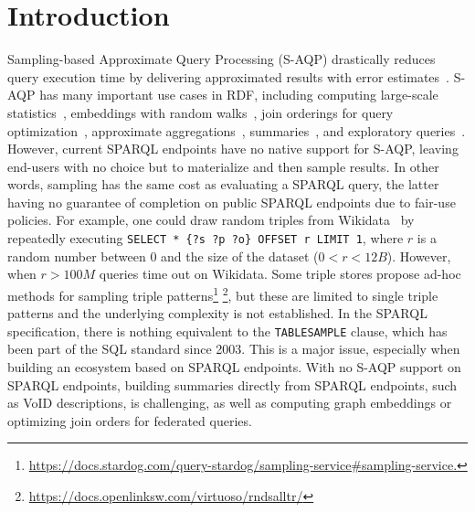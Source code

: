 
\section{Introduction}

Sampling-based Approximate Query Processing (S-AQP) drastically reduces query
execution time by delivering approximated results with error
estimates~\cite{DBLP:conf/sigmod/AgarwalMKTJMMS14}. S-AQP has many important use cases in RDF, including
computing large-scale statistics~\cite{soulet2019anytime,10.1007/978-3-319-18818-8_14},
embeddings with random walks~\cite{ristoski2016rdf2vec}, join
orderings for query optimization~\cite{DBLP:conf/cidr/LeisRGK017},
approximate
aggregations~\cite{wang2022approximate},
summaries~\cite{10.1007/978-3-030-49461-2_10}, and exploratory
queries~\cite{DBLP:conf/sigmod/AgarwalMKTJMMS14}.
%
However, current SPARQL endpoints have no native support for S-AQP,
leaving end-users with no choice but to materialize and then sample
results. In other words, sampling has the same cost as evaluating a
SPARQL query, the latter having no guarantee of completion on public
SPARQL endpoints due to fair-use policies. 
%
For example, one could draw random triples from Wikidata~\cite{soulet2019anytime}
by repeatedly executing \lstinline[language=SPARQL]|SELECT * {?s ?p ?o} OFFSET r LIMIT 1|,
where $r$ is a random number between $0$ and
the size of the dataset ($0<r<12B$). However, when $r > 100M$ queries time out on Wikidata.
Some triple stores propose ad-hoc methods for sampling
triple patterns\footnote{\url{https://docs.stardog.com/query-stardog/sampling-service\#sampling-service.}}
\footnote{\url{https://docs.openlinksw.com/virtuoso/rndsalltr/}},
but these are limited to single triple patterns and the
underlying complexity is not established. In the SPARQL specification, there is nothing
equivalent to the \texttt{TABLESAMPLE} clause, which has been part of the SQL
standard since 2003. This is a major issue, especially when building an ecosystem based on SPARQL endpoints. With no S-AQP support
on SPARQL endpoints, building summaries directly from SPARQL endpoints, such as VoID descriptions, is challenging, as well as computing graph
embeddings or optimizing join orders for federated queries.



